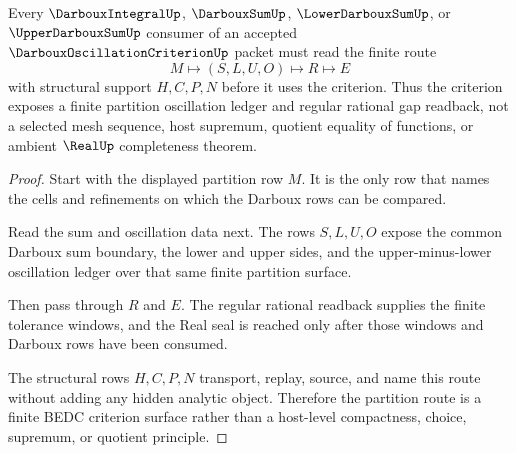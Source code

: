 \begin{theorem}
\label{thm:darboux-oscillation-criterion-partition-route}
Every $\DarbouxIntegralUp$, $\DarbouxSumUp$, $\LowerDarbouxSumUp$, or $\UpperDarbouxSumUp$ consumer of an accepted $\DarbouxOscillationCriterionUp$ packet must read the finite route
$$
M \longmapsto (S,L,U,O) \longmapsto R \longmapsto E
$$
with structural support $H,C,P,N$ before it uses the criterion. Thus the criterion exposes a finite partition oscillation ledger and regular rational gap readback, not a selected mesh sequence, host supremum, quotient equality of functions, or ambient $\RealUp$ completeness theorem.
\end{theorem}
\begin{proof}
Start with the displayed partition row $M$. It is the only row that names the cells and refinements on which the Darboux rows can be compared.

Read the sum and oscillation data next. The rows $S,L,U,O$ expose the common Darboux sum boundary, the lower and upper sides, and the upper-minus-lower oscillation ledger over that same finite partition surface.

Then pass through $R$ and $E$. The regular rational readback supplies the finite tolerance windows, and the Real seal is reached only after those windows and Darboux rows have been consumed.

The structural rows $H,C,P,N$ transport, replay, source, and name this route without adding any hidden analytic object. Therefore the partition route is a finite BEDC criterion surface rather than a host-level compactness, choice, supremum, or quotient principle.
\end{proof}


